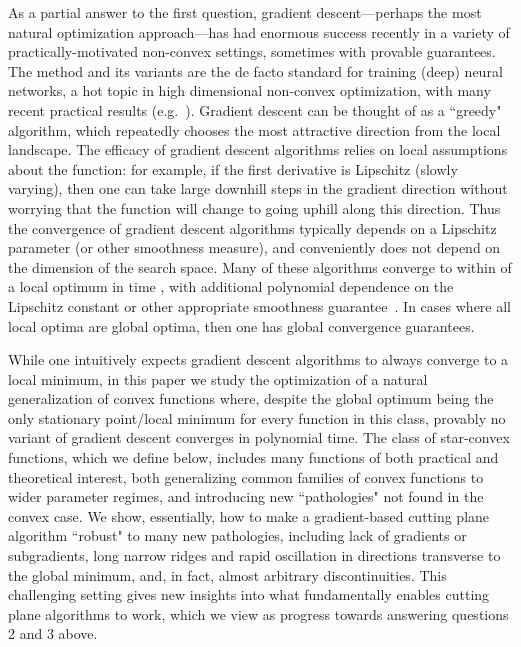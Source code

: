 \documentclass[11pt,letter]{article}
\numberwithin{nTheorems}{section}
\begin{document}
As a partial answer to the first question, gradient descent---perhaps the most natural optimization approach---has had enormous success recently in a variety of practically-motivated non-convex settings, sometimes with provable guarantees. The method and its variants are the de facto standard for training (deep) neural networks, a hot topic in high dimensional non-convex optimization, with many recent practical results (e.g.~\cite{Imagenet,AlphaGo}). Gradient descent can be thought of as a ``greedy" algorithm, which repeatedly chooses the most attractive direction from the local landscape. The efficacy of gradient descent algorithms relies on local assumptions about the function: for example, if the first derivative is Lipschitz (slowly varying), then one can take large downhill steps in the gradient direction without worrying that the function will change to going uphill along this direction. Thus the convergence of gradient descent algorithms typically depends on a Lipschitz parameter (or other smoothness measure), and conveniently does not depend on the dimension of the search space. Many of these algorithms converge to within  of a local optimum in time , with additional polynomial dependence on the Lipschitz constant or other appropriate smoothness guarantee~\cite{Nesterov:AGD,Hazan:2015}. In cases where all local optima are global optima, then one has global convergence guarantees.

While one intuitively expects gradient descent algorithms to always converge to a local minimum, in this paper we study the optimization of a natural generalization of convex functions where, despite the global optimum being the only stationary point/local minimum for every function in this class, provably no variant of gradient descent converges in polynomial time. The class of star-convex functions, which we define below, includes many functions of both practical and theoretical interest, both generalizing common families of convex functions to wider parameter regimes, and introducing new ``pathologies" not found in the convex case. We show, essentially, how to make a gradient-based cutting plane algorithm ``robust" to many new pathologies, including lack of gradients or subgradients, long narrow ridges and rapid oscillation in directions transverse to the global minimum, and, in fact, almost arbitrary discontinuities. This challenging setting gives new insights into what fundamentally enables cutting plane algorithms to work, which we view as progress towards answering questions 2 and 3 above.
\end{document}
